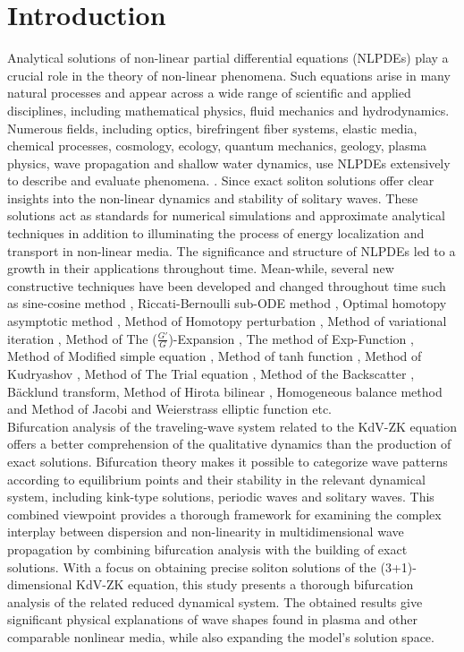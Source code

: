 \documentclass{article}
\numberwithin{equation}{section}
\begin{document}
\section{Introduction}
\noindent Analytical solutions of non-linear partial differential equations (NLPDEs) play a crucial role in the theory of non-linear phenomena. Such equations arise in many natural processes and appear across a wide range of scientific and applied disciplines, including mathematical physics, fluid mechanics and hydrodynamics. Numerous fields, including optics, birefringent fiber systems, elastic media, chemical processes, cosmology, ecology, quantum mechanics, geology, plasma physics, wave propagation and shallow water dynamics, use NLPDEs extensively to describe and evaluate phenomena. \cite{b1,b2,b3,b4,b5,b6,b7,b8,b9,b10,b11,b12}. Since exact soliton solutions offer clear insights into the non-linear dynamics and stability of solitary waves. These solutions act as standards for numerical simulations and approximate analytical techniques in addition to illuminating the process of energy localization and transport in non-linear media. The significance and structure of NLPDEs led to a growth in their applications throughout time. Mean-while, several new constructive techniques have been developed and changed throughout time such as sine-cosine method \cite{b13,b14}, Riccati-Bernoulli sub-ODE method \cite{b15}, Optimal homotopy asymptotic method \cite{b16,b17,b18,b19}, Method of Homotopy perturbation \cite{b20}, Method of variational iteration \cite{b21}, Method of The ($\frac{G'}{G}$)-Expansion \cite{b22,b23,b24}, The method of Exp-Function \cite{b25,b26,b27,b28}, Method of Modified simple equation \cite{b29,b30}, Method of tanh function \cite{b31,b32,b33}, Method of Kudryashov \cite{b34,b35}, Method of The Trial equation \cite{b36}, Method of the Backscatter \cite{b37}, B\"{a}cklund transform\cite{b38}, Method of Hirota bilinear \cite{b39}, Homogeneous balance method\cite{b40} and Method of Jacobi and Weierstrass elliptic function \cite{b41} etc.\\
Bifurcation analysis of the traveling-wave system related to the KdV-ZK equation offers a better comprehension of the qualitative dynamics than the production of exact solutions. Bifurcation theory makes it possible to categorize wave patterns according to equilibrium points and their stability in the relevant dynamical system, including kink-type solutions, periodic waves and solitary waves. This combined viewpoint provides a thorough framework for examining the complex interplay between dispersion and non-linearity in multidimensional wave propagation by combining bifurcation analysis with the building of exact solutions. With a focus on obtaining precise soliton solutions of the (3+1)-dimensional KdV-ZK equation, this study presents a thorough bifurcation analysis of the related reduced dynamical system. The obtained results give significant physical explanations of wave shapes found in plasma and other comparable nonlinear media, while also expanding the model's solution space.\\
\end{document}
